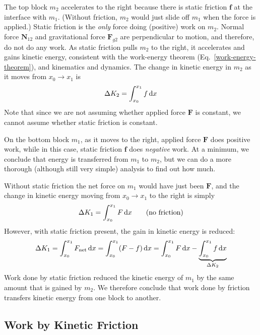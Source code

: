 The top block $m_2$ accelerates to the right because there is static
friction $\bm f$ at the interface with $m_1$. (Without friction, $m_2$
would just slide off $m_1$ when the force is applied.) Static friction is
the \emph{only} force doing (positive) work on $m_2$. Normal force
$\bm N_{12}$ and gravitational force $\bm F_{g2}$ are perpendicular to
motion, and therefore, do not do any work.
As static friction pulls $m_2$ to the right, it accelerates and gains kinetic
energy, consistent with the work-energy theorem
(Eq.~\ref{work-energy-theorem}), and kinematics and dynamics. The change in
kinetic energy in $m_2$ as it moves from $x_0\longrightarrow x_1$ is
\begin{equation*}
  \Delta K_2=\int_{x_0}^{x_1} f\dl x
\end{equation*}
Note that since we are not assuming whether applied force $\bm F$ is
constant, we cannot assume whether static friction is constant.

On the bottom block $m_1$, as it moves to the right, applied force $\bm F$
does positive work, while in this case, static friction $\bm f$ does
\emph{negative} work. At a minimum, we conclude that energy is transferred
from $m_1$ to $m_2$, but we can do a more thorough (although still very simple)
analysis to find out how much.

Without static friction
the net force on $m_1$ would have just been $\bm F$, and the change in
kinetic energy moving from $x_0\longrightarrow x_1$ to the right is simply
\begin{equation*}
  \Delta K_1 = \int_{x_0}^{x_1} F\dl x\quad\quad\text{(no friction)}
\end{equation*}
However, with static friction present, the gain in kinetic energy is reduced:
\begin{equation*}
  \Delta K_1 = \int_{x_0}^{x_1} F_\text{net}\dl x =
  \int_{x_0}^{x_1} (F-f)\dl x = \int_{x_0}^{x_1} F\dl x -
  \underbrace{\int_{x_0}^{x_1} f\dl x}_{\Delta K_2}
\end{equation*}
Work done by static friction reduced the kinetic energy of $m_1$ by the same
amount that is gained by $m_2$. We therefore conclude that work done by
friction transfers kinetic energy from one block to another.




\subsection{Work by Kinetic Friction}





